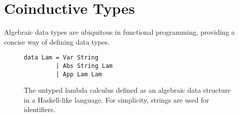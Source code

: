 \section{Coinductive Types}
\label{sec:coinductive-types}



Algebraic data types are ubiquitous in functional programming, providing a
concise way of defining data types.

\begin{figure} 
\begin{lstlisting}
data Lam = Var String
         | Abs String Lam
         | App Lam Lam
\end{lstlisting}
\caption{The untyped lambda calculus defined as an algebraic data structure in a
Haskell-like language. For simplicity, strings are used for identifiers.}
\end{figure}

